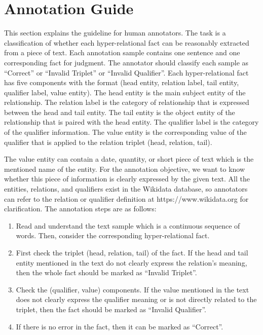 \documentclass[11pt]{article}
\begin{document}
\appendix




\section{Annotation Guide}
\label{sec:guide}
This section explains the guideline for human annotators.
The task is a classification of whether each hyper-relational fact can be reasonably extracted from a piece of text.
Each annotation sample contains one sentence and one corresponding fact for judgment.
The annotator should classify each sample as “Correct” or “Invalid Triplet” or “Invalid Qualifier”.
Each hyper-relational fact has five components with the format (head entity, relation label, tail entity, qualifier label, value entity).
The head entity is the main subject entity of the relationship.
The relation label is the  category of relationship that is expressed between the head and tail entity.
The tail entity is the object entity of the relationship that is paired with the head entity.
The qualifier label is the category of the qualifier information.
The value entity is the corresponding value of the qualifier that is applied to the relation triplet (head, relation, tail).

The value entity can contain a date, quantity, or short piece of text which is the mentioned name of the entity.
For the annotation objective, we want to know whether this piece of information is clearly expressed by the given text.
All the entities, relations, and qualifiers exist in the Wikidata database, so annotators can refer to the relation or qualifier definition at https://www.wikidata.org for clarification.
The annotation steps are as follows:
\begin{enumerate}
    \item Read and understand the text sample which is a continuous sequence of words. 
    Then, consider the corresponding hyper-relational fact. 
    \item First check the triplet (head, relation, tail) of the fact.
    If the head and tail entity mentioned in the text do not clearly express the relation's meaning, then the whole fact should be marked as “Invalid Triplet”.
    \item Check the (qualifier, value) components. If the value mentioned in the text does not clearly express the qualifier meaning or is not directly related to the triplet, then the fact should be marked as “Invalid Qualifier”.
    \item If there is no error in the fact, then it can be marked as “Correct”.
\end{enumerate}
\end{document}
